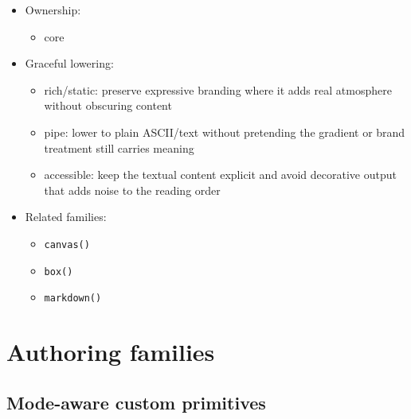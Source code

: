 \begin{itemize}
  \begin{itemize}
  \tightlist
  \item
    treat logos and gradients as rare emphasis, not the default voice of the interface
  \item
    never make critical state, instructions, or navigation depend on gradient color alone
  \item
    use expressive branding to open, celebrate, or orient, then get out of the user's way
  \end{itemize}
\item
  Ownership:

  \begin{itemize}
  \tightlist
  \item
    core
  \end{itemize}
\item
  Graceful lowering:

  \begin{itemize}
  \tightlist
  \item
    rich/static: preserve expressive branding where it adds real atmosphere without obscuring content
  \item
    pipe: lower to plain ASCII/text without pretending the gradient or brand treatment still carries meaning
  \item
    accessible: keep the textual content explicit and avoid decorative output that adds noise to the reading order
  \end{itemize}
\item
  Related families:

  \begin{itemize}
  \tightlist
  \item
    \texttt{c\allowbreak{}a\allowbreak{}n\allowbreak{}v\allowbreak{}a\allowbreak{}s\allowbreak{}(\allowbreak{})}
  \item
    \texttt{b\allowbreak{}o\allowbreak{}x\allowbreak{}(\allowbreak{})}
  \item
    \texttt{m\allowbreak{}a\allowbreak{}r\allowbreak{}k\allowbreak{}d\allowbreak{}o\allowbreak{}w\allowbreak{}n\allowbreak{}(\allowbreak{})}
  \end{itemize}
\end{itemize}

\section{Authoring families}\label{record-019-authoring-families}

\subsection{Mode-aware custom primitives}\label{record-019-mode-aware-custom-primitives}

